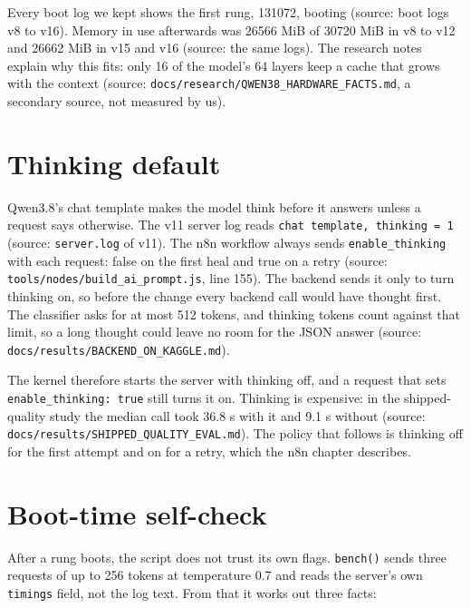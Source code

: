 Every boot log we kept shows the first rung, 131072, booting (source: boot logs v8 to v16). Memory in use afterwards was 26566 MiB of 30720 MiB in v8 to v12 and 26662 MiB in v15 and v16 (source: the same logs). The research notes explain why this fits: only 16 of the model's 64 layers keep a cache that grows with the context (source: \texttt{docs/\allowbreak{}research/\allowbreak{}QWEN38\_\allowbreak{}HARDWARE\_\allowbreak{}FACTS.\allowbreak{}md}, a secondary source, not measured by us).

\section{Thinking default}

Qwen3.8's chat template makes the model think before it answers unless a request says otherwise. The v11 server log reads \texttt{chat template, thinking = 1} (source: \texttt{server.\allowbreak{}log} of v11). The n8n workflow always sends \texttt{enable\_\allowbreak{}thinking} with each request: false on the first heal and true on a retry (source: \texttt{tools/\allowbreak{}nodes/\allowbreak{}build\_\allowbreak{}ai\_\allowbreak{}prompt.\allowbreak{}js}, line 155). The backend sends it only to turn thinking on, so before the change every backend call would have thought first. The classifier asks for at most 512 tokens, and thinking tokens count against that limit, so a long thought could leave no room for the JSON answer (source: \texttt{docs/\allowbreak{}results/\allowbreak{}BACKEND\_\allowbreak{}ON\_\allowbreak{}KAGGLE.\allowbreak{}md}).

The kernel therefore starts the server with thinking off, and a request that sets \texttt{enable\_\allowbreak{}thinking:\allowbreak{} true} still turns it on. Thinking is expensive: in the shipped-quality study the median call took 36.8 s with it and 9.1 s without (source: \texttt{docs/\allowbreak{}results/\allowbreak{}SHIPPED\_\allowbreak{}QUALITY\_\allowbreak{}EVAL.\allowbreak{}md}). The policy that follows is thinking off for the first attempt and on for a retry, which the n8n chapter describes.

\section{Boot-time self-check}

After a rung boots, the script does not trust its own flags. \texttt{bench()} sends three requests of up to 256 tokens at temperature 0.7 and reads the server's own \texttt{timings} field, not the log text. From that it works out three facts:

